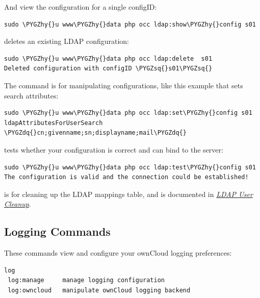 \documentclass[letterpaper,10pt,english]{sphinxmanual}
\def\PYGZhy{\char`\-}
\def\PYGZsq{\char`\'}
\def\PYGZdq{\char`\"}
\begin{document}
And view the configuration for a single configID:

\begin{Verbatim}[commandchars=\\\{\}]
sudo \PYGZhy{}u www\PYGZhy{}data php occ ldap:show\PYGZhy{}config s01
\end{Verbatim}

 deletes an existing LDAP configuration:

\begin{Verbatim}[commandchars=\\\{\}]
sudo \PYGZhy{}u www\PYGZhy{}data php occ ldap:delete  s01
Deleted configuration with configID \PYGZsq{}s01\PYGZsq{}
\end{Verbatim}

The  command is for manipulating configurations, like this
example that sets search attributes:

\begin{Verbatim}[commandchars=\\\{\}]
sudo \PYGZhy{}u www\PYGZhy{}data php occ ldap:set\PYGZhy{}config s01 ldapAttributesForUserSearch
\PYGZdq{}cn;givenname;sn;displayname;mail\PYGZdq{}
\end{Verbatim}

 tests whether your configuration is correct and can bind to
the server:

\begin{Verbatim}[commandchars=\\\{\}]
sudo \PYGZhy{}u www\PYGZhy{}data php occ ldap:test\PYGZhy{}config s01
The configuration is valid and the connection could be established!
\end{Verbatim}

 is for cleaning up the LDAP mappings table, and is
documented in {\hyperref[configuration_user/user_auth_ldap_cleanup::doc]{\emph{LDAP User Cleanup}}}.


\subsection{Logging Commands}
\label{configuration_server/occ_command:logging-commands-label}\label{configuration_server/occ_command:logging-commands}
These commands view and configure your ownCloud logging preferences:

\begin{Verbatim}[commandchars=\\\{\}]
log
 log:manage     manage logging configuration
 log:owncloud   manipulate ownCloud logging backend
\end{Verbatim}
\end{document}
